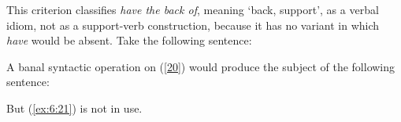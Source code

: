 \documentclass[output=paper]{langsci/langscibook}
\begin{document}
\begin{exe}
\ex \label{ex:6:19}
\begin{xlist}
\end{xlist}
\end{exe}

\noindent This criterion classifies \textit{have the back of}, meaning ‘back, support’, as a verbal idiom, not as a support-verb construction, because it has no variant in which \textit{have} would be absent. Take the following sentence:


 
\begin{exe}
\end{exe}
	 
\noindent A banal syntactic operation on (\ref{20}) would produce the subject of the following sentence:


\begin{exe}
\end{exe}

\noindent But (\ref{ex:6:21}) is not in use.
\end{document}
